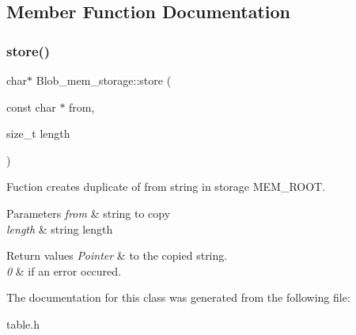 \subsection{Member Function Documentation}
\mbox{\label{classBlob__mem__storage_a0226d57def9b7f4565b6a2fa00093137}} 
\subsubsection{\texorpdfstring{store()}{store()}}
{\footnotesize\ttfamily char$\ast$ Blob\+\_\+mem\+\_\+storage\+::store (\begin{DoxyParamCaption}\item[{const char $\ast$}]{from,  }\item[{size\+\_\+t}]{length }\end{DoxyParamCaption})\hspace{0.3cm}{\ttfamily [inline]}}

Fuction creates duplicate of \textquotesingle{}from\textquotesingle{} string in \textquotesingle{}storage\textquotesingle{} M\+E\+M\+\_\+\+R\+O\+OT.


\begin{DoxyParams}{Parameters}
{\em from} & string to copy \\
\hline
{\em length} & string length\\
\hline
\end{DoxyParams}

\begin{DoxyRetVals}{Return values}
{\em Pointer} & to the copied string. \\
\hline
{\em 0} & if an error occured. \\
\hline
\end{DoxyRetVals}


The documentation for this class was generated from the following file\+:\begin{DoxyCompactItemize}
\item 
table.\+h\end{DoxyCompactItemize}
